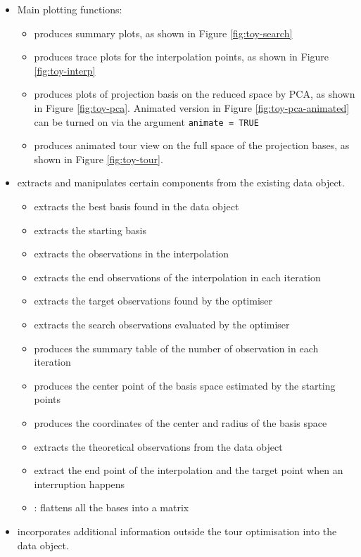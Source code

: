 \begin{itemize}
\item
  Main plotting functions:

  \begin{itemize}
  \tightlist
  \item
     produces summary plots, as shown in
    Figure \ref{fig:toy-search}
  \item
    produces trace plots for the
    interpolation points, as shown in Figure \ref{fig:toy-interp}
  \item
     produces plots of projection basis on
    the reduced space by PCA, as shown in Figure \ref{fig:toy-pca}.
    Animated version in Figure \ref{fig:toy-pca-animated} can be turned
    on via the argument \texttt{animate\ =\ TRUE}
  \item
     produces animated tour view on the
    full space of the projection bases, as shown in Figure
    \ref{fig:toy-tour}.
  \end{itemize}
\item
   extracts and manipulates certain components from the
  existing data object.

  \begin{itemize}
  \tightlist
  \item
     extracts the best basis found in the data object
  \item
     extracts the starting basis
  \item
     extracts the observations in the interpolation
  \item
     extracts the end observations of the
    interpolation in each iteration
  \item
     extracts the target observations found by the
    optimiser
  \item
     extracts the search observations evaluated by
    the optimiser
  \item
     produces the summary table of the number
    of observation in each iteration
  \item
     produces the center point of the basis space
    estimated by the starting points
  \item
     produces the coordinates of the center
    and radius of the basis space
  \item
     extracts the theoretical observations from the
    data object
  \item
     extract the end point of the interpolation
    and the target point when an interruption happens
  \item
    : flattens all the bases into a matrix
  \end{itemize}
\item
   incorporates additional information outside the tour
  optimisation into the data object.


\end{itemize}
